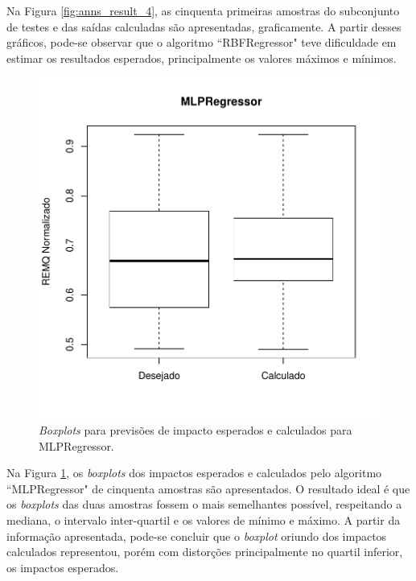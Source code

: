 Na Figura \ref{fig:anns_result_4}, as cinquenta primeiras amostras do subconjunto de testes e das saídas calculadas são apresentadas, graficamente. A partir desses gráficos, pode-se observar que o algoritmo ``RBFRegressor" teve dificuldade em estimar os resultados esperados, principalmente os valores máximos e mínimos.

\begin{figure}[!h]
  \vspace{-0.2cm}
  \centering
  \includegraphics[trim = 1mm 12mm 1mm 1mm,clip,width=0.7\columnwidth]{image/mlpreg_ex4.pdf}
  \caption{\textit{Boxplots} para previsões de impacto esperados e calculados para MLPRegressor.}
  \label{fig:anns_result_7}
\end{figure}

Na Figura \ref{fig:anns_result_7}, os \textit{boxplots} dos impactos esperados e calculados pelo algoritmo ``MLPRegressor" de cinquenta amostras são apresentados. O resultado ideal é que os \textit{boxplots} das duas amostras fossem o mais semelhantes possível, respeitando a mediana, o intervalo inter-quartil e os valores de mínimo e máximo. A partir da informação apresentada, pode-se concluir que o \textit{boxplot} oriundo dos impactos calculados representou, porém com distorções principalmente no quartil inferior, os impactos esperados.

